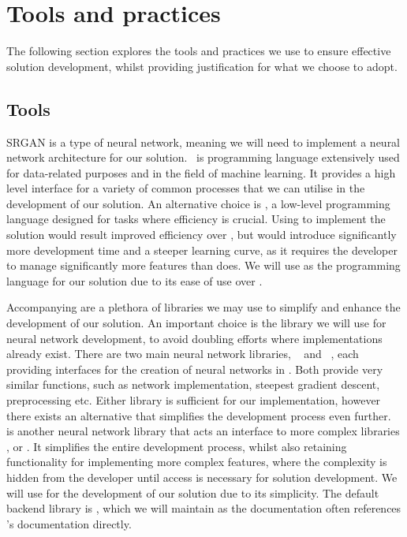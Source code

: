 \section{Tools and practices}\label{sec:tools_and_practices}
The following section explores the tools and practices we use to ensure effective solution development, whilst providing justification for what we choose to adopt.

\subsection{Tools}
SRGAN is a type of neural network, meaning we will need to implement a neural network architecture for our solution.\  is programming language extensively used for data-related purposes and in the field of machine learning. It provides a high level interface for a variety of common processes that we can utilise in the development of our solution. An alternative choice is , a low-level programming language designed for tasks where efficiency is crucial. Using  to implement the solution would result improved efficiency over , but would introduce significantly more development time and a steeper learning curve, as it requires the developer to manage significantly more features than  does. We will use  as the programming language for our solution due to its ease of use over .

Accompanying  are a plethora of libraries we may use to simplify and enhance the development of our solution. An important choice is the library we will use for neural network development, to avoid doubling efforts where implementations already exist. There are two main neural network libraries, ~\cite{tensorflow} and ~\cite{pytorch}, each providing interfaces for the creation of neural networks in . Both provide very similar functions, such as network implementation, steepest gradient descent, preprocessing etc. Either library is sufficient for our implementation, however there exists an alternative that simplifies the development process even further.\ ~\cite{keras} is another neural network library that acts an interface to more complex libraries ,  or . It simplifies the entire development process, whilst also retaining functionality for implementing more complex features, where the complexity is hidden from the developer until access is necessary for solution development. We will use  for the development of our solution due to its simplicity. The default backend library is , which we will maintain as the  documentation often references 's documentation directly.

